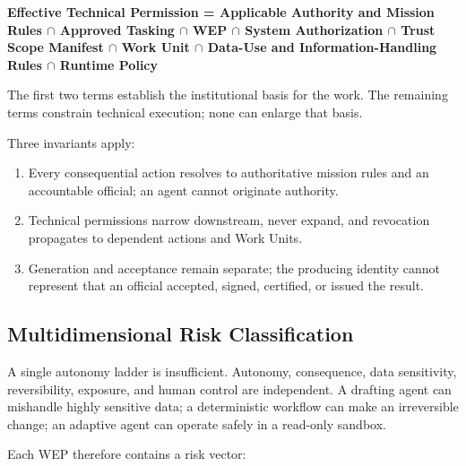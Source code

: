 \documentclass[11pt]{article}
\begin{document}
\textbf{Effective Technical Permission = Applicable Authority and
Mission Rules \ensuremath{\cap} Approved Tasking \ensuremath{\cap} WEP \ensuremath{\cap} System Authorization \ensuremath{\cap} Trust
Scope Manifest \ensuremath{\cap} Work Unit \ensuremath{\cap} Data-Use and Information-Handling Rules \ensuremath{\cap}
Runtime Policy}

The first two terms establish the institutional basis for the work. The
remaining terms constrain technical execution; none can enlarge that
basis.

Three invariants apply:

\begin{enumerate}
\def\labelenumi{\arabic{enumi}.}
\tightlist
\item
  Every consequential action resolves to authoritative mission rules and
  an accountable official; an agent cannot originate authority.
\item
  Technical permissions narrow downstream, never expand, and revocation
  propagates to dependent actions and Work Units.
\item
  Generation and acceptance remain separate; the producing identity
  cannot represent that an official accepted, signed, certified, or
  issued the result.
\end{enumerate}

\hypertarget{62-multidimensional-risk-classification}{%
\subsection{Multidimensional Risk
Classification}\label{62-multidimensional-risk-classification}}

A single autonomy ladder is insufficient. Autonomy, consequence, data
sensitivity, reversibility, exposure, and human control are independent.
A drafting agent can mishandle highly sensitive data; a deterministic
workflow can make an irreversible change; an adaptive agent can operate
safely in a read-only sandbox.

Each WEP therefore contains a risk vector:
\end{document}

